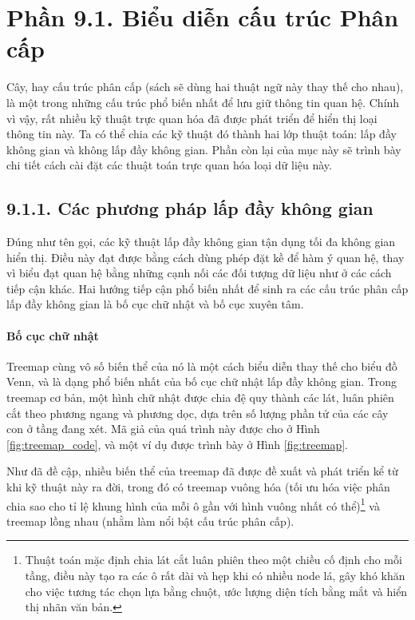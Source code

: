 \documentclass[12pt,a4paper, openany]{book}
\begin{document}
\chapter*{Phần 9.1. \newline Biểu diễn cấu trúc Phân cấp}

Cây, hay cấu trúc phân cấp (sách sẽ dùng hai thuật ngữ này thay thế cho nhau), là một trong những cấu trúc phổ biến nhất để lưu giữ thông tin quan hệ. Chính vì vậy, rất nhiều kỹ thuật trực quan hóa đã được phát triển để hiển thị loại thông tin này. Ta có thể chia các kỹ thuật đó thành hai lớp thuật toán: lấp đầy không gian và không lấp đầy không gian. Phần còn lại của mục này sẽ trình bày chi tiết cách cài đặt các thuật toán trực quan hóa loại dữ liệu này.

\section*{9.1.1. Các phương pháp lấp đầy không gian}

Đúng như tên gọi, các kỹ thuật lấp đầy không gian tận dụng tối đa không gian hiển thị. Điều này đạt được bằng cách dùng phép đặt kề để hàm ý quan hệ, thay vì biểu đạt quan hệ bằng những cạnh nối các đối tượng dữ liệu như ở các cách tiếp cận khác. Hai hướng tiếp cận phổ biến nhất để sinh ra các cấu trúc phân cấp lấp đầy không gian là bố cục chữ nhật và bố cục xuyên tâm.

\subsubsection{Bố cục chữ nhật}

Treemap \cite{johnson1991} cùng vô số biến thể của nó là một cách biểu diễn thay thế cho biểu đồ Venn, và là dạng phổ biến nhất của bố cục chữ nhật lấp đầy không gian. Trong treemap cơ bản, một hình chữ nhật được chia đệ quy thành các lát, luân phiên cắt theo phương ngang và phương dọc, dựa trên số lượng phần tử của các cây con ở tầng đang xét. Mã giả của quá trình này được cho ở Hình \ref{fig:treemap_code}, và một ví dụ được trình bày ở Hình \ref{fig:treemap}.

Như đã đề cập, nhiều biến thể của treemap đã được đề xuất và phát triển kể từ khi kỹ thuật này ra đời, trong đó có treemap vuông hóa \cite{bruls2000} (tối ưu hóa việc phân chia sao cho tỉ lệ khung hình của mỗi ô gần với hình vuông nhất có thể)\footnote{Thuật toán mặc định chia lát cắt luân phiên theo một chiều cố định cho mỗi tầng, điều này tạo ra các ô rất dài và hẹp khi có nhiều node lá, gây khó khăn cho việc tương tác chọn lựa bằng chuột, ước lượng diện tích bằng mắt và hiển thị nhãn văn bản.} và treemap lồng nhau \cite{johnson1991} (nhằm làm nổi bật cấu trúc phân cấp).
\end{document}
